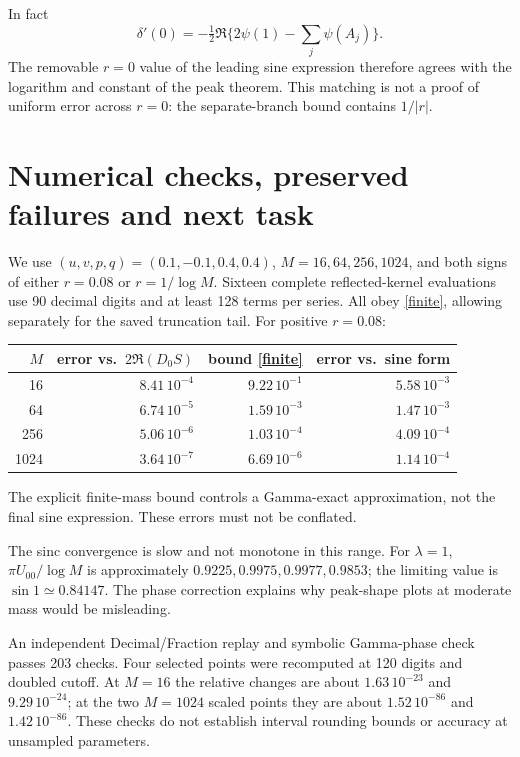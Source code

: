 \documentclass[11pt,a4paper]{article}
\begin{document}
In fact
\[
 \delta'(0)=-\tfrac12\Re\{2\psi(1)-\sum_j\psi(A_j)\}.
\]
The removable $r=0$ value of the leading sine expression therefore
agrees with the logarithm and constant of the peak theorem.
This matching is not a proof of uniform error across $r=0$:
the separate-branch bound contains $1/|r|$.

\newpage
\section{Numerical checks, preserved failures and next task}
We use $(u,v,p,q)=(0.1,-0.1,0.4,0.4)$,
$M=16,64,256,1024$, and both signs of either $r=0.08$ or
$r=1/\log M$. Sixteen complete reflected-kernel evaluations use
90 decimal digits and at least 128 terms per series.
All obey \eqref{finite}, allowing separately for the saved truncation tail.
For positive $r=0.08$:
\begin{center}
\begin{tabular}{rrrr}
\toprule
$M$ & error vs.\ $2\Re(D_0S)$ & bound \eqref{finite}
 & error vs.\ sine form\\
\midrule
16 & $8.41\,10^{-4}$ & $9.22\,10^{-1}$ & $5.58\,10^{-3}$\\
64 & $6.74\,10^{-5}$ & $1.59\,10^{-3}$ & $1.47\,10^{-3}$\\
256 & $5.06\,10^{-6}$ & $1.03\,10^{-4}$ & $4.09\,10^{-4}$\\
1024 & $3.64\,10^{-7}$ & $6.69\,10^{-6}$ & $1.14\,10^{-4}$\\
\bottomrule
\end{tabular}
\end{center}
The explicit finite-mass bound controls a Gamma-exact approximation,
not the final sine expression. These errors must not be conflated.

The sinc convergence is slow and not monotone in this range.
For $\lambda=1$, $\pi U_{00}/\log M$ is approximately
$0.9225,0.9975,0.9977,0.9853$; the limiting value is
$\sin1\simeq0.84147$. The phase correction explains why peak-shape
plots at moderate mass would be misleading.

An independent Decimal/Fraction replay and symbolic Gamma-phase
check passes 203 checks. Four selected points were recomputed at
120 digits and doubled cutoff. At $M=16$ the relative changes are
about $1.63\,10^{-23}$ and $9.29\,10^{-24}$; at the two $M=1024$
scaled points they are about $1.52\,10^{-86}$ and $1.42\,10^{-86}$.
These checks do not establish interval rounding bounds or accuracy
at unsampled parameters.
\end{document}
